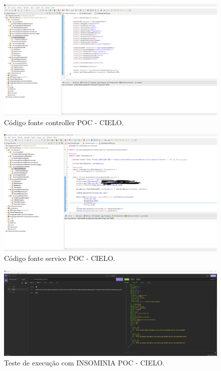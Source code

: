  \begin{figure}[ht]
    \centering
    \includegraphics[width=1\textwidth]{interoperabilidade_cielo_controller.png}
    \caption{Código fonte controller POC - CIELO.}
    \label{fig:Código fonte controller POC - CIELO.}
 \end{figure}

 \begin{figure}[ht]
    \centering
    \includegraphics[width=1\textwidth]{interoperabilidade_cielo_service.png}
    \caption{Código fonte service POC - CIELO.}
    \label{fig:Código fonte service POC - CIELO.}
 \end{figure}

 \begin{figure}[ht]
    \centering
    \includegraphics[width=1\textwidth]{interoperabilidade_retorno_insominia.png}
    \caption{Teste de execução com INSOMINIA POC - CIELO.}
    \label{fig:Teste de execução com INSOMINIA POC - CIELO.}
 \end{figure}




